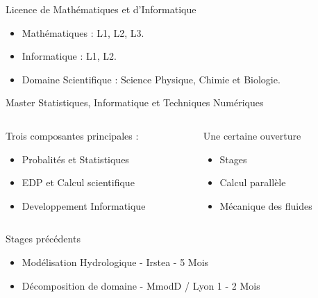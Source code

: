 \documentclass{beamer}
\begin{document}
\begin{frame}
  \begin{block}{Licence de Mathématiques et d'Informatique}
    \begin{itemize}
      \item Mathématiques : L1, L2, L3.
      \item Informatique : L1, L2.
      \item Domaine Scientifique : Science Physique, Chimie et Biologie.
    \end{itemize}
  \end{block}

  \begin{block}{Master Statistiques, Informatique et Techniques Numériques}
    \begin{columns}[t]

      \begin{column}{5.5cm}
        Trois composantes principales :
        \begin{itemize}
          \item Probalités et Statistiques 
          \item EDP et Calcul scientifique
          \item Developpement Informatique
        \end{itemize}
      \end{column}

      \begin{column}{4.5cm}
        Une certaine ouverture  
        \begin{itemize}
          \item \alert{Stages}
          \item Calcul parallèle
          \item Mécanique des fluides
        \end{itemize}
      \end{column}
    \end{columns}  
  \end{block}

    \begin{block}{Stages précédents}
      \begin{itemize}
        \item Modélisation Hydrologique - Irstea - 5 Mois
        \item Décomposition de domaine - MmodD / Lyon 1 - 2 Mois
      \end{itemize}
  \end{block}

\end{frame}
\end{document}

